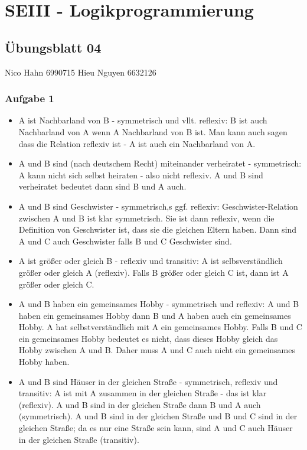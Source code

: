 \documentclass[]{article}
\date{}
\begin{document}
\section{SEIII - Logikprogrammierung}\label{header-n93}

\subsection{Übungsblatt 04}\label{header-n95}

Nico Hahn 6990715 Hieu Nguyen 6632126

\subsubsection{Aufgabe 1}\label{header-n99}

\begin{itemize}
\item
  A ist Nachbarland von B - symmetrisch und vllt. reflexiv: B ist auch
  Nachbarland von A wenn A Nachbarland von B ist. Man kann auch sagen
  dass die Relation reflexiv ist - A ist auch ein Nachbarland von A.
\end{itemize}

\begin{itemize}
\item
  A und B sind (nach deutschem Recht) miteinander verheiratet -
  symmetrisch: A kann nicht sich selbst heiraten - also nicht reflexiv.
  A und B sind verheiratet bedeutet dann sind B und A auch.
\item
  A und B sind Geschwister - symmetrisch,s ggf. reflexiv:
  Geschwister-Relation zwischen A und B ist klar symmetrisch. Sie ist
  dann reflexiv, wenn die Definition von Geschwister ist, dass sie die
  gleichen Eltern haben. Dann sind A und C auch Geschwister falls B und
  C Geschwister sind. 
\item
  A ist größer oder gleich B - reflexiv und transitiv: A ist
  selbsverständlich größer oder gleich A (reflexiv). Falls B größer oder
  gleich C ist, dann ist A größer oder gleich C.
\item
  A und B haben ein gemeinsames Hobby - symmetrisch und reflexiv: A und
  B haben ein gemeinsames Hobby dann B und A haben auch ein gemeinsames
  Hobby. A hat selbstverständlich mit A ein gemeinsames Hobby. Falls B
  und C ein gemeinsames Hobby bedeutet es nicht, dass dieses Hobby
  gleich das Hobby zwischen A und B. Daher muss A und C auch nicht ein
  gemeinsames Hobby haben.
\item
  A und B sind Häuser in der gleichen Straße - symmetrisch, reflexiv und
  transitiv: A ist mit A zusammen in der gleichen Straße - das ist klar
  (reflexiv). A und B sind in der gleichen Straße dann B und A auch
  (symmetrisch). A und B sind in der gleichen Straße und B und C sind in
  der gleichen Straße; da es nur eine Straße sein kann, sind A und C
  auch Häuser in der gleichen Straße (transitiv).
\end{itemize}
\end{document}
